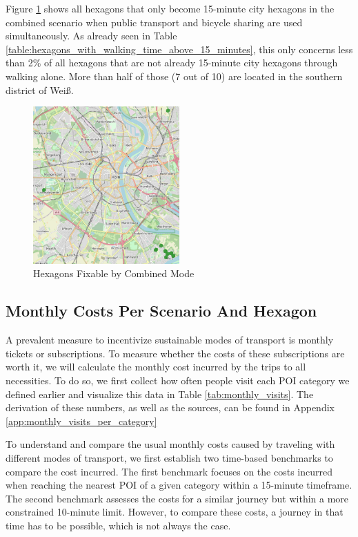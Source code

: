 Figure \ref{fig:combined_hexagons} shows all hexagons that only become 15-minute city hexagons in the combined scenario when public transport and bicycle sharing are used simultaneously.
As already seen in Table \ref{table:hexagons_with_walking_time_above_15_minutes}, this only concerns less than 2\% of all hexagons that are not already 15-minute city hexagons through walking alone.
More than half of those (7 out of 10) are located in the southern district of Weiß.
\begin{figure}
  \begin{center}
    \includegraphics[width=0.50\textwidth]{Figures/results/problematic_hexagons/combined_hexagons}
  \end{center}
  \caption{Hexagons Fixable by Combined Mode}
  \label{fig:combined_hexagons}
\end{figure}


\subsection{Monthly Costs Per Scenario And Hexagon}
\label{sec:monthly_costs}
A prevalent measure to incentivize sustainable modes of transport is monthly tickets or subscriptions.
To measure whether the costs of these subscriptions are worth it, we will calculate the monthly cost incurred by the trips to all necessities.
To do so, we first collect how often people visit each POI category we defined earlier and visualize this data in Table \ref{tab:monthly_visits}.
The derivation of these numbers, as well as the sources, can be found in Appendix \ref{app:monthly_visits_per_category}

To understand and compare the usual monthly costs caused by traveling with different modes of transport, we first establish two time-based benchmarks to compare the cost incurred.
The first benchmark focuses on the costs incurred when reaching the nearest POI of a given category within a 15-minute timeframe. 
The second benchmark assesses the costs for a similar journey but within a more constrained 10-minute limit.
However, to compare these costs, a journey in that time has to be possible, which is not always the case.

